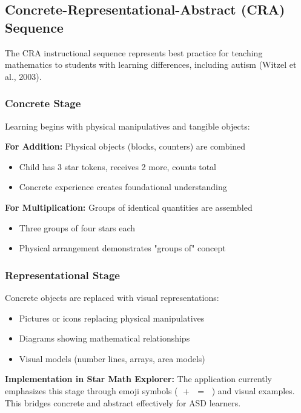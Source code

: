 \documentclass[12pt, a4paper]{article}
\begin{document}
\subsection{Concrete-Representational-Abstract (CRA) Sequence}

The CRA instructional sequence represents best practice for teaching mathematics to students with learning differences, including autism (Witzel et al., 2003).

\subsubsection{Concrete Stage}

Learning begins with physical manipulatives and tangible objects:

\textbf{For Addition:} Physical objects (blocks, counters) are combined
\begin{itemize}[leftmargin=*]
    \item Child has 3 star tokens, receives 2 more, counts total
    \item Concrete experience creates foundational understanding
\end{itemize}

\textbf{For Multiplication:} Groups of identical quantities are assembled
\begin{itemize}[leftmargin=*]
    \item Three groups of four stars each
    \item Physical arrangement demonstrates "groups of" concept
\end{itemize}

\subsubsection{Representational Stage}

Concrete objects are replaced with visual representations:

\begin{itemize}[leftmargin=*]
    \item Pictures or icons replacing physical manipulatives
    \item Diagrams showing mathematical relationships
    \item Visual models (number lines, arrays, area models)
\end{itemize}

\textbf{Implementation in Star Math Explorer:}
The application currently emphasizes this stage through emoji symbols (🍎 + 🍎 = 🍎🍎) and visual examples. This bridges concrete and abstract effectively for ASD learners.
\end{document}
